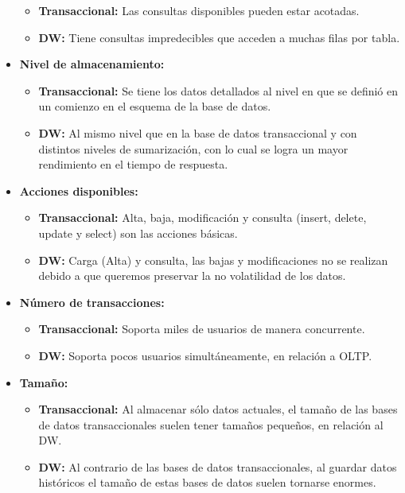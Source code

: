 \documentclass[a4paper,11pt]{article}
\begin{document}
\begin{itemize}
\begin{itemize}
          \item \textbf{Transaccional:} Las consultas disponibles pueden estar acotadas.
          \item \textbf{DW:} Tiene consultas impredecibles que acceden a muchas filas por tabla.
        \end{itemize}
      \item \textbf{Nivel de almacenamiento:}
        \begin{itemize}
          \item \textbf{Transaccional:} Se tiene los datos detallados al nivel en que se definió en un comienzo en el esquema de la base de datos.
          \item \textbf{DW:} Al mismo nivel que en la base de datos transaccional y con distintos niveles de sumarización, con lo cual se logra un mayor
          rendimiento en el tiempo de respuesta.
        \end{itemize}
      \item \textbf{Acciones disponibles:}
        \begin{itemize}
          \item \textbf{Transaccional:} Alta, baja, modificación y consulta (insert, delete, update y select) son las acciones básicas.
          \item \textbf{DW:} Carga (Alta) y consulta, las bajas y modificaciones no se realizan debido a que queremos preservar la no volatilidad de los
          datos.
        \end{itemize}
      \item \textbf{Número de transacciones:}
        \begin{itemize}
          \item \textbf{Transaccional:} Soporta miles de usuarios de manera concurrente.
          \item \textbf{DW:} Soporta pocos usuarios simultáneamente, en relación a  OLTP.
        \end{itemize}
      \item \textbf{Tamaño:}
        \begin{itemize}
          \item \textbf{Transaccional:} Al almacenar sólo datos actuales, el tamaño de las bases de datos transaccionales suelen tener tamaños pequeños,
          en relación al DW.
          \item \textbf{DW:} Al contrario de las bases de datos transaccionales, al guardar datos históricos el tamaño de estas bases de datos suelen
          tornarse enormes.

\end{itemize}
\end{itemize}
\end{document}
